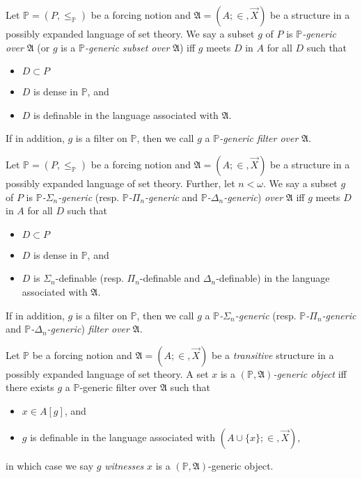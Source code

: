 \documentclass[12pt]{article}
\numberwithin{equation}{section}
\begin{document}
\begin{defi}
Let $\mathbb{P} = (P, \leq_{\mathbb{P}})$ be a forcing notion and $\mathfrak{A} = (A; \in, \Vec{X})$ be a structure in a possibly expanded language of set theory. We say a subset $g$ of $P$ is $\mathbb{P}$\emph{-generic over} $\mathfrak{A}$ (or $g$ is a $\mathbb{P}$\emph{-generic subset over} $\mathfrak{A}$) iff $g$ meets $D$ in $A$ for all $D$ such that
\begin{itemize}
    \item $D \subset P$
    \item $D$ is dense in $\mathbb{P}$, and
    \item $D$ is definable in the language associated with $\mathfrak{A}$.
\end{itemize}
If in addition, $g$ is a filter on $\mathbb{P}$, then we call $g$ a $\mathbb{P}$\emph{-generic filter over} $\mathfrak{A}$.
\end{defi}

\begin{defi}
Let $\mathbb{P} = (P, \leq_{\mathbb{P}})$ be a forcing notion and $\mathfrak{A} = (A; \in, \Vec{X})$ be a structure in a possibly expanded language of set theory. Further, let $n < \omega$. We say a subset $g$ of $P$ is $\mathbb{P}$\emph{-}$\Sigma_n$\emph{-generic} (resp. $\mathbb{P}$\emph{-}$\Pi_n$\emph{-generic} and $\mathbb{P}$\emph{-}$\Delta_n$\emph{-generic}) \emph{over} $\mathfrak{A}$ iff $g$ meets $D$ in $A$ for all $D$ such that
\begin{itemize}
    \item $D \subset P$
    \item $D$ is dense in $\mathbb{P}$, and
    \item $D$ is $\Sigma_n$-definable (resp. $\Pi_n$-definable and $\Delta_n$-definable) in the language associated with $\mathfrak{A}$.
\end{itemize}
If in addition, $g$ is a filter on $\mathbb{P}$, then we call $g$ a $\mathbb{P}$\emph{-}$\Sigma_n$\emph{-generic} (resp. $\mathbb{P}$\emph{-}$\Pi_n$\emph{-generic} and $\mathbb{P}$\emph{-}$\Delta_n$\emph{-generic}) \emph{filter over} $\mathfrak{A}$.
\end{defi}

\begin{defi}
Let $\mathbb{P}$ be a forcing notion and $\mathfrak{A} = (A; \in, \Vec{X})$ be a \emph{transitive} structure in a possibly expanded language of set theory. A set $x$ is a $(\mathbb{P}, \mathfrak{A})$\emph{-generic object} iff there exists $g$ a $\mathbb{P}$-generic filter over $\mathfrak{A}$ such that
\begin{itemize}
    \item $x \in A[g]$, and
    \item $g$ is definable in the language associated with $(A \cup \{x\}; \in, \Vec{X})$,
\end{itemize}
in which case we say $g$ \emph{witnesses} $x$ is a $(\mathbb{P}, \mathfrak{A})$-generic object.
\end{defi}
\end{document}
